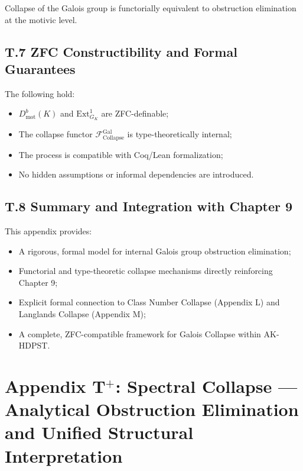 \documentclass[11pt]{article}
\begin{document}
Collapse of the Galois group is functorially equivalent to obstruction elimination at the motivic level.

\subsection*{T.7 ZFC Constructibility and Formal Guarantees}

The following hold:

\begin{itemize}
    \item $D^b_{\mathrm{mot}}(K)$ and $\mathrm{Ext}^1_{G_K}$ are ZFC-definable;
    \item The collapse functor $\mathcal{F}_{\mathrm{Collapse}}^{\mathrm{Gal}}$ is type-theoretically internal;
    \item The process is compatible with Coq/Lean formalization;
    \item No hidden assumptions or informal dependencies are introduced.
\end{itemize}

\subsection*{T.8 Summary and Integration with Chapter 9}

This appendix provides:

\begin{itemize}
    \item A rigorous, formal model for internal Galois group obstruction elimination;
    \item Functorial and type-theoretic collapse mechanisms directly reinforcing Chapter 9;
    \item Explicit formal connection to Class Number Collapse (Appendix L) and Langlands Collapse (Appendix M);
    \item A complete, ZFC-compatible framework for Galois Collapse within AK-HDPST.
\end{itemize}




\section*{Appendix T$^{+}$: Spectral Collapse — Analytical Obstruction Elimination and Unified Structural Interpretation}
\end{document}
